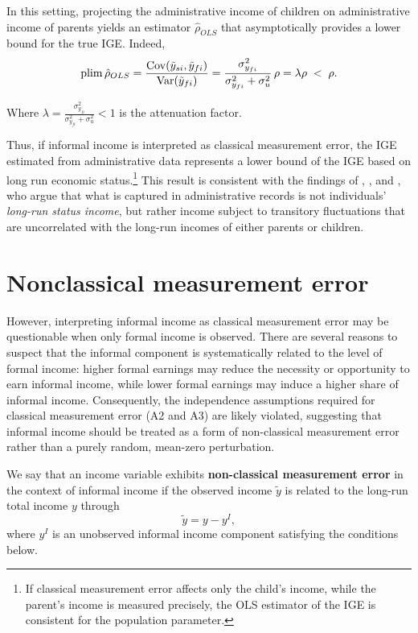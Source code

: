 In this setting, projecting the administrative income of children on administrative income of parents yields an estimator $\hat{\rho}_{OLS}$ that asymptotically provides a lower bound for the true IGE. Indeed,
\[
\operatorname*{plim} \hat{\rho}_{OLS} 
= \frac{\operatorname{Cov}(\tilde{y}_{si},\tilde{y}_{fi})}{\operatorname{Var}(\tilde{y}_{fi})}
= \frac{ \sigma_{y_{fi}}^2}{ \sigma_{y_{fi}}^2+\sigma^2_u}\,\rho = \lambda\rho
\;<\; \rho.
\]

Where $\lambda =\frac{ \sigma_{y_{fi}}^2}{ \sigma_{y_{fi}}^2+\sigma^2_u}<1$ is the attenuation factor. 


Thus, if informal income is interpreted as classical measurement error, the IGE estimated from administrative data represents a lower bound of the IGE based on long run economic status.\footnote{If classical measurement error affects only the child’s income, while the parent’s income is measured precisely, the OLS estimator of the IGE is consistent for the population parameter.}
 This result is consistent with the findings of \textcite{Zimmerman_1992}, \textcite{Solon_1992}, and \textcite{Björklund_1997}, who argue that what is captured in administrative records is not individuals’ \textit{long-run status income}, but rather income subject to transitory fluctuations that are uncorrelated with the long-run incomes of either parents or children.

\section{Nonclassical measurement error}
However, interpreting informal income as classical measurement error may be questionable when only formal income is observed. There are several reasons to suspect that the informal component is systematically related to the level of formal income: higher formal earnings may reduce the necessity or opportunity to earn informal income, while lower formal earnings may induce a higher share of informal income. Consequently, the independence assumptions required for classical measurement error (A2 and A3) are likely violated, suggesting that informal income should be treated as a form of non-classical measurement error rather than a purely random, mean-zero perturbation.

We say that an income variable exhibits \textbf{non-classical measurement error} in the context of informal income if the observed income $\tilde y$ is related to the long-run total income $y$ through
\[
\tilde y = y - y^I,
\]
where $y^I$ is an unobserved informal income component satisfying the conditions below.

